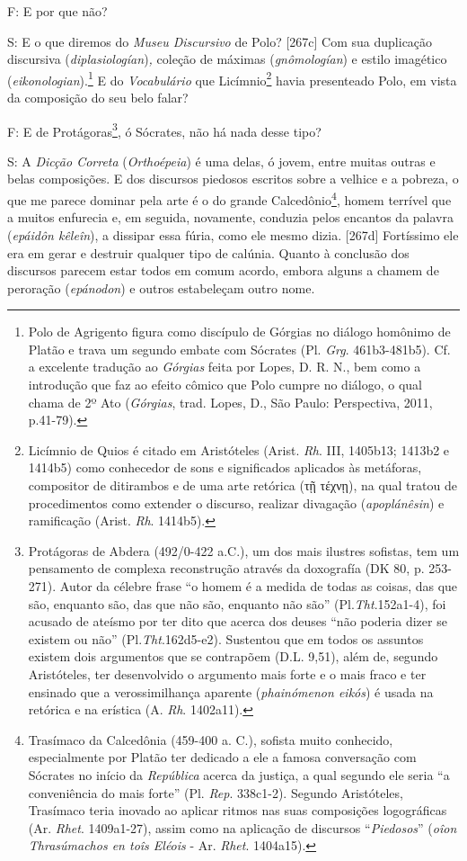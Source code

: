 F: E por que não?

S: E o que diremos do \emph{Museu Discursivo} de Polo? {[}267c{]} Com
sua duplicação discursiva (\emph{diplasiologían})\emph{,} coleção de
máximas (\emph{gnômologían}) e estilo imagético
(\emph{eikonologian}).\footnote{Polo de Agrigento figura como discípulo
  de Górgias no diálogo homônimo de Platão e trava um segundo embate com
  Sócrates (Pl. \emph{Grg}. 461b3-481b5). Cf. a excelente tradução ao
  \emph{Górgias} feita por Lopes, D. R. N., bem como a introdução que
  faz ao efeito cômico que Polo cumpre no diálogo, o qual chama de 2º
  Ato (\emph{Górgias}, trad. Lopes, D., São Paulo: Perspectiva, 2011,
  p.41-79).} E do \emph{Vocabulário} que Licímnio\footnote{Licímnio de
  Quios é citado em Aristóteles (Arist. \emph{Rh}. III, 1405b13; 1413b2
  e 1414b5) como conhecedor de sons e significados aplicados às
  metáforas, compositor de ditirambos e de uma arte retórica (τῇ τέχνῃ),
  na qual tratou de procedimentos como extender o discurso, realizar
  divagação (\emph{apoplánêsin}) e ramificação (Arist. \emph{Rh}.
  1414b5).} havia presenteado Polo, em vista da composição do seu belo
falar?

F: E de Protágoras\footnote{Protágoras de Abdera (492/0-422 a.C.), um
  dos mais ilustres sofistas, tem um pensamento de complexa reconstrução
  através da doxografía (DK 80, p. 253-271). Autor da célebre frase ``o
  homem é a medida de todas as coisas, das que são, enquanto são, das
  que não são, enquanto não são'' (Pl.\emph{Tht}.152a1-4), foi acusado
  de ateísmo por ter dito que acerca dos deuses ``não poderia dizer se
  existem ou não'' (Pl.\emph{Tht}.162d5-e2). Sustentou que em todos os
  assuntos existem dois argumentos que se contrapõem (D.L. 9,51), além
  de, segundo Aristóteles, ter desenvolvido o argumento mais forte e o
  mais fraco e ter ensinado que a verossimilhança aparente
  (\emph{phainómenon eikós}) é usada na retórica e na erística (A.
  \emph{Rh}. 1402a11).}, ó Sócrates, não há nada desse tipo?

S: A \emph{Dicção Correta} (\emph{Orthoépeia}) é uma delas, ó jovem,
entre muitas outras e belas composições. E dos discursos piedosos
escritos sobre a velhice e a pobreza, o que me parece dominar pela arte
é o do grande Calcedônio\footnote{Trasímaco da Calcedônia (459-400 a.
  C.), sofista muito conhecido, especialmente por Platão ter dedicado a
  ele a famosa conversação com Sócrates no início da \emph{República}
  acerca da justiça, a qual segundo ele seria ``a conveniência do mais
  forte'' (Pl. \emph{Rep}. 338c1-2). Segundo Aristóteles, Trasímaco
  teria inovado ao aplicar ritmos nas suas composições logográficas (Ar.
  \emph{Rhet}. 1409a1-27), assim como na aplicação de discursos
  ``\emph{Piedosos}'' (\emph{oîon Thrasúmachos en toîs Eléois} - Ar.
  \emph{Rhet}. 1404a15).}, homem terrível que a muitos enfurecia e, em
seguida, novamente, conduzia pelos encantos da palavra (\emph{epáidôn
kêleîn}), a dissipar essa fúria, como ele mesmo dizia. {[}267d{]}
Fortíssimo ele era em gerar e destruir qualquer tipo de calúnia. Quanto
à conclusão dos discursos parecem estar todos em comum acordo, embora
alguns a chamem de peroração (\emph{epánodon}) e outros estabeleçam
outro nome.

